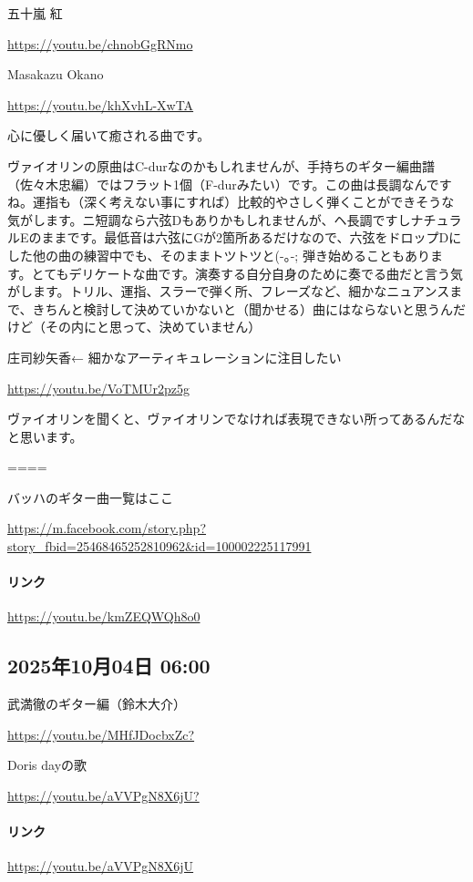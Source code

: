 五十嵐 紅

\url{https://youtu.be/chnobGgRNmo}

Masakazu Okano

\url{https://youtu.be/khXvhL-XwTA}

心に優しく届いて癒される曲です。

ヴァイオリンの原曲はC-durなのかもしれませんが、手持ちのギター編曲譜（佐々木忠編）ではフラット1個（F-durみたい）です。この曲は長調なんですね。運指も（深く考えない事にすれば）比較的やさしく弾くことができそうな気がします。ニ短調なら六弦Dもありかもしれませんが、ヘ長調ですしナチュラルEのままです。最低音は六弦にGが2箇所あるだけなので、六弦をドロップDにした他の曲の練習中でも、そのままトツトツと(-｡-;  弾き始めることもあります。とてもデリケートな曲です。演奏する自分自身のために奏でる曲だと言う気がします。トリル、運指、スラーで弾く所、フレーズなど、細かなニュアンスまで、きちんと検討して決めていかないと（聞かせる）曲にはならないと思うんだけど（その内にと思って、決めていません）

庄司紗矢香← 細かなアーティキュレーションに注目したい

\url{https://youtu.be/VoTMUr2pz5g}

ヴァイオリンを聞くと、ヴァイオリンでなければ表現できない所ってあるんだなと思います。

====

バッハのギター曲一覧はここ

\url{https://m.facebook.com/story.php?story_fbid=25468465252810962&id=100002225117991}

\paragraph{リンク}
\url{https://youtu.be/kmZEQWQh8o0}

\subsection*{2025年10月04日 06:00}

武満徹のギター編（鈴木大介）

\url{https://youtu.be/MHfJDocbxZc?}

Doris dayの歌

\url{https://youtu.be/aVVPgN8X6jU?}

\paragraph{リンク}
\url{https://youtu.be/aVVPgN8X6jU}

